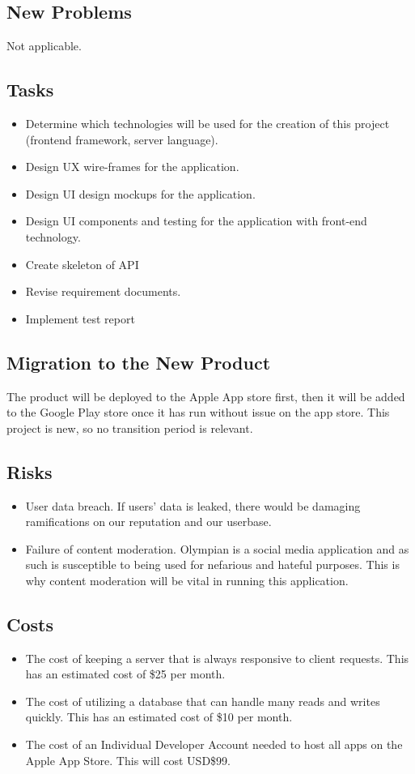 \documentclass[12pt]{article}
\begin{document}
		\subsection{New Problems}
			Not applicable.
		\subsection{Tasks}
			\begin{itemize}
			\item Determine which technologies will be used for the creation of this project (frontend framework, server language).
			\item  Design UX wire-frames for the application.
			\item  Design UI design mockups for the application.
			\item  Design UI components and testing for the application with front-end technology.
			\item  Create skeleton of API
			\item  Revise requirement documents.
			\item  Implement test report
			\end{itemize}
		\subsection{Migration to the New Product}
			The product will be deployed to the Apple App store first, then it will be added to the Google Play store once it has run without issue on the app store.
			This project is new, so no transition period is relevant.
		\subsection{Risks}
			\begin{itemize}
			\item User data breach. If users' data is leaked, there would be damaging ramifications on our reputation and our userbase.
			\item Failure of content moderation. Olympian is a social media application and as such is susceptible to being used for nefarious and hateful purposes. This is why content moderation will be vital in running this application.
			\end{itemize}
		\subsection{Costs}
			\begin{itemize}
			\item The cost of keeping a server that is always responsive to client requests. This has an estimated cost of \$25 per month.
			\item The cost of utilizing a database that can handle many reads and writes quickly. This has an estimated cost of \$10 per month.
			\item The cost of an Individual Developer Account needed to host all apps on the Apple App Store. This will cost USD\$99.
			\end{itemize}
\end{document}
